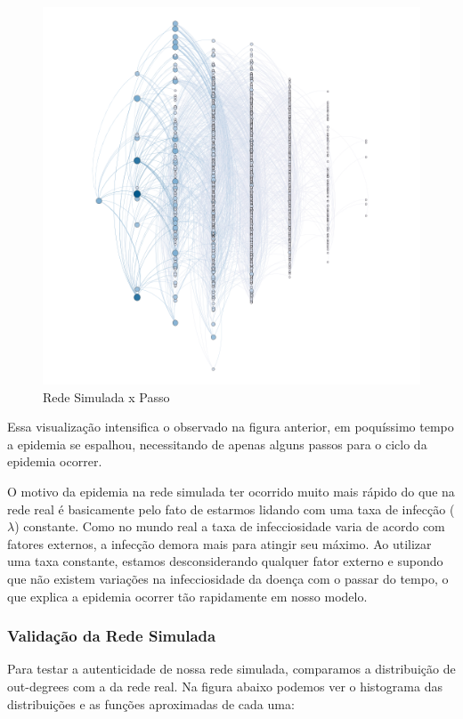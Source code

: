 \documentclass[a4paper,12pt]{article}
\begin{document}
\begin{figure}[h]
 \centering
 \includegraphics[scale=0.4]{../results/Untitled.png}
 \caption{Rede Simulada x Passo}
\end{figure}

Essa visualização intensifica o observado na figura anterior, em poquíssimo tempo a epidemia se espalhou, necessitando de apenas alguns passos
para o ciclo da epidemia ocorrer. 

O motivo da epidemia na rede simulada ter ocorrido muito mais rápido do que na rede real é basicamente pelo fato de estarmos lidando com uma
taxa de infecção ($\lambda$) constante. Como no mundo real a taxa de infecciosidade varia de acordo com fatores externos, a infecção demora mais
para atingir seu máximo. Ao utilizar uma taxa constante, estamos desconsiderando qualquer fator externo e supondo que não existem
variações na infecciosidade da doença com o  passar do tempo, o que explica a epidemia ocorrer tão rapidamente em nosso modelo.

\subsubsection{Validação da Rede Simulada}

Para testar a autenticidade de nossa rede simulada, comparamos a distribuição de out-degrees com a da rede real. Na figura abaixo podemos ver
o histograma das distribuições e as funções aproximadas de cada uma:
\end{document}
